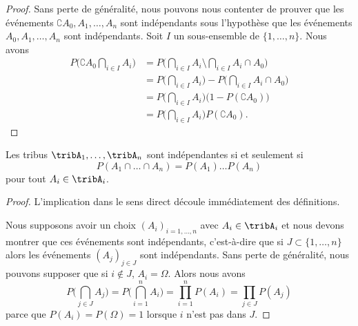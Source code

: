 \begin{proof}
	Sans perte de généralité, nous pouvons nous contenter de prouver que les événements \( \complement A_0,A_1,\ldots,A_n\) sont indépendants sous l'hypothèse que les événements \( A_0,A_1,\ldots,A_n\) sont indépendants. Soit \( I\) un sous-ensemble de \( \{ 1,\ldots,n \}\). Nous avons
	\begin{subequations}
		\begin{align}
			P\big( \complement A_0\bigcap_{i\in I}A_i \big) & =P\big( \bigcap_{i\in I}A_i\setminus\bigcap_{i\in I}A_i\cap A_0 \big)      \\
			                                                & =P\big( \bigcap_{i\in I}A_i \big)-P\big( \bigcap_{i\in I}A_i\cap A_0 \big) \\
			                                                & =P\big( \bigcap_{i\in I}A_i \big)\big( 1-P(\complement A_0) \big)          \\
			                                                & =P\big( \bigcap_{i\in I}A_i \big)P(\complement A_0).
		\end{align}
	\end{subequations}
\end{proof}

\begin{lemma}       \label{LemTribIndepProdProb}
	Les tribus \( \tribA_1,\ldots,\tribA_n\) sont indépendantes si et seulement si
	\begin{equation}
		P(A_1\cap\ldots\cap A_n)=P(A_1)\ldots P(A_n)
	\end{equation}
	pour tout \( A_i\in\tribA_i\).
\end{lemma}

\begin{proof}
	L'implication dans le sens direct découle immédiatement des définitions.

	Nous supposons avoir un choix \( (A_i)_{i=1,\ldots,n}\) avec \( A_i\in\tribA_i\) et nous devons montrer que ces événements sont indépendants, c'est-à-dire que si \( J\subset\{ 1,\ldots,n \}\) alors les événements \( (A_j)_{j\in J}\) sont indépendants. Sans perte de généralité, nous pouvons supposer que si \( i\notin J\), \( A_i=\Omega\). Alors nous avons
	\begin{equation}
		P\big( \bigcap_{j\in J}A_j \big)=P\big( \bigcap_{i=1}^nA_i \big)=\prod_{i=1}^nP(A_i)=\prod_{j\in J}P(A_j)
	\end{equation}
	parce que \( P(A_i)=P(\Omega)=1\) lorsque \( i\) n'est pas dans \( J\).
\end{proof}

